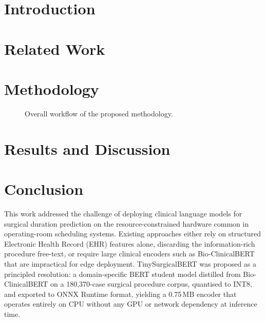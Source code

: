 \documentclass[3p]{elsarticle}
\begin{document}
\section{Introduction}\label{sec:introduction}


\section{Related Work}\label{sec:related_work}


\section{Methodology}\label{sec:methodology}


\begin{figure}[tp]
\centering

\caption{Overall workflow of the proposed methodology.}
\label{fig:flowchart}
\end{figure}

\section{Results and Discussion}\label{sec:results}


\section{Conclusion}\label{sec:conclusion}
This work addressed the challenge of deploying clinical language models for surgical duration prediction on the resource-constrained hardware common in operating-room scheduling systems. Existing approaches either rely on structured Electronic Health Record (EHR) features alone, discarding the information-rich procedure free-text, or require large clinical encoders such as Bio-ClinicalBERT that are impractical for edge deployment. TinySurgicalBERT was proposed as a principled resolution: a domain-specific BERT student model distilled from Bio-ClinicalBERT on a 180{,}370-case surgical procedure corpus, quantised to INT8, and exported to ONNX Runtime format, yielding a 0.75\,MB encoder that operates entirely on CPU without any GPU or network dependency at inference time.
\end{document}
